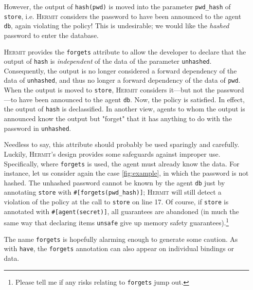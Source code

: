 \documentclass[letterpaper,twocolumn,10pt]{article}
\newcommand{\Hermit}{\textsc{Hermit}}
\begin{document}
However, the output of \lstinline{hash(pwd)} is moved into the parameter \lstinline{pwd_hash} of
\lstinline{store}, i.e. \Hermit{} considers the password to have been announced to the agent
\lstinline{db}, again violating the policy! This is undesirable; we would like the \emph{hashed}
password to enter the database.

\Hermit{} provides the \lstinline{forgets} attribute to allow the developer to declare that the
output of \lstinline{hash} is \emph{independent} of the data of the parameter \lstinline{unhashed}.
Consequently, the output is no longer considered a forward dependency of the data of
\lstinline{unhashed}, and thus no longer a forward dependency of the data of \lstinline{pwd}. When
the output is moved to \lstinline{store}, \Hermit{} considers it---but not the password---to have
been announced to the agent \lstinline{db}. Now, the policy is satisfied. In effect, the output of
\lstinline{hash} is declassified. In another view, agents to whom the output is announced know the
output but "forget" that it has anything to do with the password in \lstinline{unhashed}.

Needless to say, this attribute should probably be used sparingly and carefully. Luckily, \Hermit's
design provides some safeguards against improper use. Specifically, where \lstinline{forgets} is
used, the agent must already know the data. For instance, let us consider again the case
\cref{fig:example}, in which the password is not hashed. The unhashed password cannot be known by
the agent \lstinline{db} just by annotating \lstinline{store} with \lstinline{#[forgets(pwd_hash)]};
\Hermit{} will still detect a violation of the policy at the call to \lstinline{store} on line 17.
Of course, if \lstinline{store} is annotated with \lstinline{#[agent(secret)]}, all guarantees are
abandoned (in much the same way that declaring items \lstinline{unsafe} give up memory safety
guarantees).\footnote{Please tell me if any risks relating to \lstinline{forgets} jump out.}

The name \lstinline{forgets} is hopefully alarming enough to generate some caution. As with
\lstinline{have}, the \lstinline{forgets} annotation can also appear on individual bindings or data.

\end{document}
